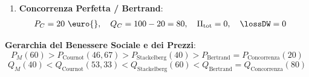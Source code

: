 \begin{esercizio}
\begin{enumerate}
    \item \textbf{Concorrenza Perfetta / Bertrand}:
    \begin{align*}
        P_C &= 20\text{ \euro{}}, \quad Q_C = 100 - 20 = 80, \quad \Pi_{\text{tot}} = 0, \quad \lossDW = 0
    \end{align*}
\end{enumerate}
\textbf{Gerarchia del Benessere Sociale e dei Prezzi}:
\begin{equation*}
    P_M (60) > P_{\text{Cournot}} (46{,}67) > P_{\text{Stackelberg}} (40) > P_{\text{Bertrand}} = P_{\text{Concorrenza}} (20)
\end{equation*}
\begin{equation*}
    Q_M (40) < Q_{\text{Cournot}} (53{,}33) < Q_{\text{Stackelberg}} (60) < Q_{\text{Bertrand}} = Q_{\text{Concorrenza}} (80)
\end{equation*}
\end{esercizio}
